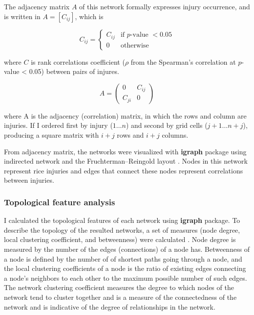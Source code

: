 The adjacency matrix $A$ of this network formally expresses injury occurrence, and is written in $A=[C_{ij}]$, which is

\begin{equation}
C_{ij} = \begin{cases}
C_{ij} & \text{if }  p\text{-value } < 0.05 \\ 
0 & \text{otherwise}
\end{cases}
\end{equation}

where $C$ is rank correlations coefficient ($\rho$ from the Spearman’s correlation at $p$-value < 0.05) between pairs of injures.

\begin{equation}
A = \begin{pmatrix}
0 & C_{ij}\\ 
C_{ji} & 0
\end{pmatrix}
\end{equation}

where A is the adjacency (correlation) matrix, in which the rows and column are injuries. If I ordered first by injury ($1\dots n$) and second by grid cells ($j + 1\dots n + j$), producing a square matrix with $i + j$ rows and $i + j$ columns.

From adjacency matrix, the networks were visualized with \textbf{igraph} package \citep{Csardi_2010_igraph} using indirected network and the Fruchterman–Reingold layout \citep{Fruchterman_1991_Graph}. Nodes in this network represent rice injuries and edges that connect these nodes represent correlations between injuries. 

\subsubsection{Topological feature analysis}

I calculated the topological features of each network using \textbf{igraph} package. To describe the topology of the resulted networks, a set of measures (node degree, local clustering coefficient, and betweenness) were calculated \citep{Newman_2006_Modularity}. Node degree is measured by the number of the edges (connections) of a node has. Betweenness of a node is defined by the number of of shortest paths going through a node, and the local clustering coefficients of a node is the ratio of existing edges connecting a node's neighbors to each other to the maximum possible number of such edges. The network clustering coefficient measures the degree to which nodes of the network tend to cluster together and is a measure of the connectedness of the network and is indicative of the degree of relationships in the network. 

